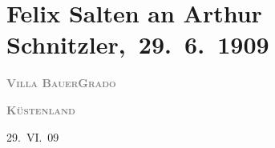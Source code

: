 

\renewcommand{\erwaehntePersonen}{Personen: Josef Kainz, Margarethe Kainz, Anna Katharina Rehmann, Felix Salten, Paul Salten, Olga Schnitzler, Heinrich Schnitzler}
\renewcommand{\erwaehnteInstitutionen}{Institutionen: Burgtheater}
\renewcommand{\erwaehnteOrte}{Orte: Grado, Lido, Venedig, Villa Bauer, Wien}
\renewcommand{\erwaehnteWerke}{Werke: Der neue Vertrag Josef Kainz’, Neue Freie Presse}
\section[ Felix Salten an Arthur Schnitzler, 29. 6. 1909]{Felix Salten an Arthur Schnitzler, 29. 6. 1909}
\nopagebreak{}
\rehead{ }\normalsize\beginnumbering{}
\toendnotes[C]{\smallbreak\pagebreak[2]}
\toendnotes[C]{\smallbreak}
\pstart
           \noindent{}{\pb}\textcolor{pink}{\textcolor{gray}{\textbf{\textsc{Villa Bauer}}}}{}\ledrightnote{\textcolor{pink}{Villa Bauer}}\hfill \textcolor{pink}{\textcolor{gray}{\textbf{\textsc{Grado}}}}{}\ledrightnote{\textcolor{pink}{Grado}}\pend
           
\pstart
           \raggedleft{}\textcolor{gray}{\textbf{\textsc{Küstenland}}}\pend
           
\pstart
           \raggedleft{}29. VI. 09\pend
           
